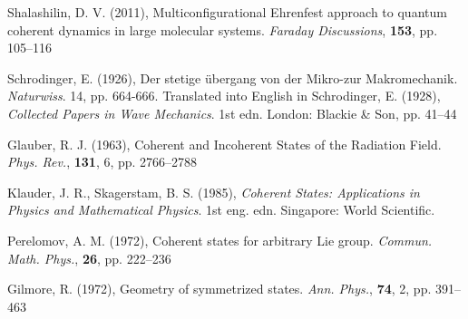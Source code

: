 \documentclass[12pt]{article}
\begin{document}
	
	\begin{thebibliography}{10}

	Shalashilin, D. V. (2011), Multiconfigurational Ehrenfest approach to quantum coherent dynamics in large molecular systems. \textit{Faraday Discussions}, \textbf{153}, pp. 105--116
	
	Schrodinger, E. (1926), Der stetige übergang von der Mikro-zur Makromechanik. \textit{Naturwiss}. 14, pp. 664-666. Translated into English in Schrodinger, E. (1928), \textit{Collected Papers in Wave Mechanics}. 1st edn. London: Blackie \& Son, pp. 41--44
	
	Glauber, R. J. (1963), Coherent and Incoherent States of the Radiation Field. \textit{Phys. Rev.}, \textbf{131}, 6, pp. 2766--2788
	
	Klauder, J. R., Skagerstam, B. S. (1985), \textit{Coherent States: Applications in Physics and Mathematical Physics}. 1st eng. edn. Singapore: World Scientific.
	
	Perelomov, A. M. (1972), Coherent states for arbitrary Lie group. \textit{Commun. Math. Phys.}, \textbf{26}, pp. 222--236
	
	Gilmore, R. (1972), Geometry of symmetrized states. \textit{Ann. Phys.}, \textbf{74}, 2, pp. 391--463

	\end{thebibliography}
	
	
	
	
	

	
	
\end{document}
